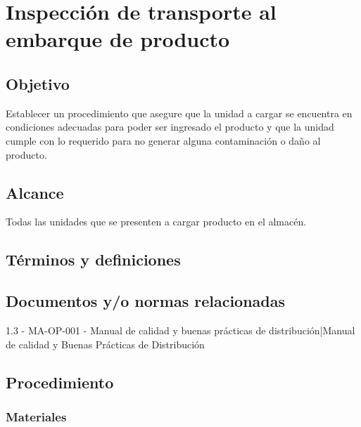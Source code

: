 \renewcommand{\MayorVer}{2}
\renewcommand{\MenorVer}{1}
\renewcommand{\Codigo}{PSA-1-PROG} %
\renewcommand{\FechaPub}{2023--01}
\renewcommand{\Titulo}{Inspección de transporte al embarque de producto}

\section{\Titulo}


\subsection{Objetivo}

Establecer un procedimiento que asegure que la unidad a cargar se encuentra en condiciones adecuadas para poder ser ingresado el producto y que la unidad cumple con lo requerido para no generar alguna contaminación o daño al producto.

\subsection{Alcance}

Todas las unidades que se presenten a cargar producto en el almacén.

\subsection{Términos y definiciones}

\subsection{Documentos y/o normas relacionadas}
1.3 - MA-OP-001 - Manual de calidad y buenas prácticas de distribución|Manual de calidad y Buenas Prácticas de Distribución

\subsection{Procedimiento}

\subsubsection{Materiales}

